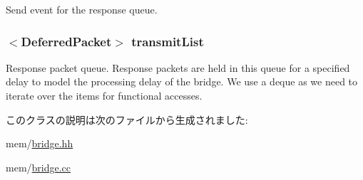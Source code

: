 \label{classBridge_1_1BridgeSlavePort_ae68804297f24d50ce6d825eccd46b6af}
Send event for the response queue. \hypertarget{classBridge_1_1BridgeSlavePort_a640fbfa2436c06d6f64608f76261e6e5}{
\subsubsection[{transmitList}]{$<${\bf DeferredPacket}$>$ {\bf transmitList}}}
\label{classBridge_1_1BridgeSlavePort_a640fbfa2436c06d6f64608f76261e6e5}
Response packet queue. Response packets are held in this queue for a specified delay to model the processing delay of the bridge. We use a deque as we need to iterate over the items for functional accesses. 

このクラスの説明は次のファイルから生成されました:\begin{DoxyCompactItemize}
\item 
mem/\hyperlink{bridge_8hh}{bridge.hh}\item 
mem/\hyperlink{bridge_8cc}{bridge.cc}\end{DoxyCompactItemize}
